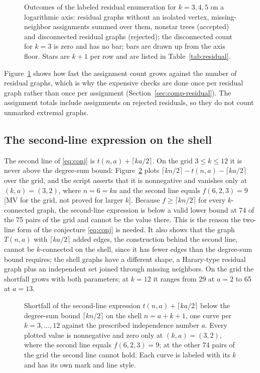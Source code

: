 

\begin{figure}[ht]
\centering

\caption{Outcomes of the labeled residual enumeration for $k=3,4,5$ on a logarithmic axis: residual graphs without an isolated vertex, missing-neighbor assignments summed over them, nonstar trees (accepted) and disconnected residual graphs (rejected); the disconnected count for $k=3$ is zero and has no bar; bars are drawn up from the axis floor. Stars are $k+1$ per row and are listed in Table~\ref{tab:residual}.}
\label{fig:residual}
\end{figure}

Figure~\ref{fig:residual} shows how fast the assignment count grows against the number of residual graphs, which is why the expensive checks are done once per residual graph rather than once per assignment (Section~\ref{sec:comp-residual}).
The assignment totals include assignments on rejected residuals, so they do not count unmarked extremal graphs.

\subsection{The second-line expression on the shell}\label{sec:res-second}

The second line of \eqref{eq:conj} is $t(n,a)+\lceil ka/2\rceil$.
On the grid $3\le k\le12$ it is never above the degree-sum bound: Figure~\ref{fig:shortfall} plots $\lceil kn/2\rceil-t(n,a)-\lceil ka/2\rceil$ over the grid, and the script asserts that it is nonnegative and vanishes only at $(k,a)=(3,2)$, where $n=6=ka$ and the second line equals $f(6,2,3)=9$ [MV for the grid, not proved for larger $k$].
Because $f\ge\lceil kn/2\rceil$ for every $k$-connected graph, the second-line expression is below a valid lower bound at 74 of the 75 pairs of the grid and cannot be the value there.
This is the reason the two-line form of the conjecture \eqref{eq:conj} is needed.
It also shows that the graph $T(n,a)$ with $\lceil ka/2\rceil$ added edges, the construction behind the second line, cannot be $k$-connected on the shell, since it has fewer edges than the degree-sum bound requires; the shell graphs have a different shape, a Harary-type residual graph plus an independent set joined through missing neighbors.
On the grid the shortfall grows with both parameters; at $k=12$ it ranges from 29 at $a=2$ to 65 at $a=13$.

\begin{figure}[ht]
\centering

\caption{Shortfall of the second-line expression $t(n,a)+\lceil ka/2\rceil$ below the degree-sum bound $\lceil kn/2\rceil$ on the shell $n=a+k+1$, one curve per $k=3,\ldots,12$ against the prescribed independence number $a$. Every plotted value is nonnegative and zero only at $(k,a)=(3,2)$, where the second line equals $f(6,2,3)=9$; at the other 74 pairs of the grid the second line cannot hold. Each curve is labeled with its $k$ and has its own mark and line style.}
\label{fig:shortfall}
\end{figure}

